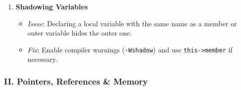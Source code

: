 \begin{enumerate}
  \begin{itemize}
  \tightlist
  \item
    \emph{Issue}:
    \passthrough{\lstinline!for (unsigned i = v.size() - 1; i >= 0; --i)!}
    causes an infinite loop because \passthrough{\lstinline!unsigned!}
    is never negative.
  \item
    \emph{Fix}: Use \passthrough{\lstinline!int!} (and cast size) or
    standard iterators/ranges.
  \end{itemize}
\item
  \textbf{Shadowing Variables}

  \begin{itemize}
  \tightlist
  \item
    \emph{Issue}: Declaring a local variable with the same name as a
    member or outer variable hides the outer one.
  \item
    \emph{Fix}: Enable compiler warnings
    (\passthrough{\lstinline!-Wshadow!}) and use
    \passthrough{\lstinline!this->member!} if necessary.
  \end{itemize}
\end{enumerate}

\hypertarget{ii.-pointers-references-memory}{%
\subsubsection{II. Pointers, References \&
Memory}\label{ii.-pointers-references-memory}}

